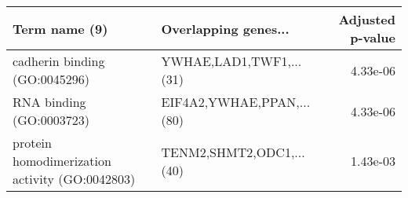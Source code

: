 \begin{tabular}{llr}
\toprule
                                 Term name (9) &      Overlapping genes... &  Adjusted p-value \\
\midrule
                 cadherin binding (GO:0045296) &   YWHAE,LAD1,TWF1,...(31) &          4.33e-06 \\
                      RNA binding (GO:0003723) & EIF4A2,YWHAE,PPAN,...(80) &          4.33e-06 \\
protein homodimerization activity (GO:0042803) &  TENM2,SHMT2,ODC1,...(40) &          1.43e-03 \\
\bottomrule
\end{tabular}

